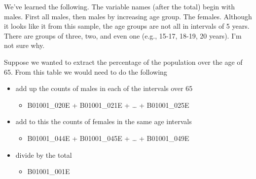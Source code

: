\documentclass[
  openany]{book}
\providecommand{\tightlist}{%
  \setlength{\itemsep}{0pt}\setlength{\parskip}{0pt}}
\begin{document}
We've learned the following. The variable names (after the total) begin with males. First all males, then males by increasing age group. The females. Although it looks like it from this sample, the age groups are not all in intervals of 5 years. There are groups of three, two, and even one (e.g., 15-17, 18-19, 20 years). I'm not sure why.

Suppose we wanted to extract the percentage of the population over the age of 65. From this table we would need to do the following

\begin{itemize}
\tightlist
\item
  add up the counts of males in each of the intervals over 65

  \begin{itemize}
  \tightlist
  \item
    B01001\_020E + B01001\_021E + \ldots{} + B01001\_025E
  \end{itemize}
\item
  add to this the counts of females in the same age intervals

  \begin{itemize}
  \tightlist
  \item
    B01001\_044E + B01001\_045E + \ldots{} + B01001\_049E
  \end{itemize}
\item
  divide by the total

  \begin{itemize}
  \tightlist
  \item
    B01001\_001E
  \end{itemize}
\end{itemize}
\end{document}
